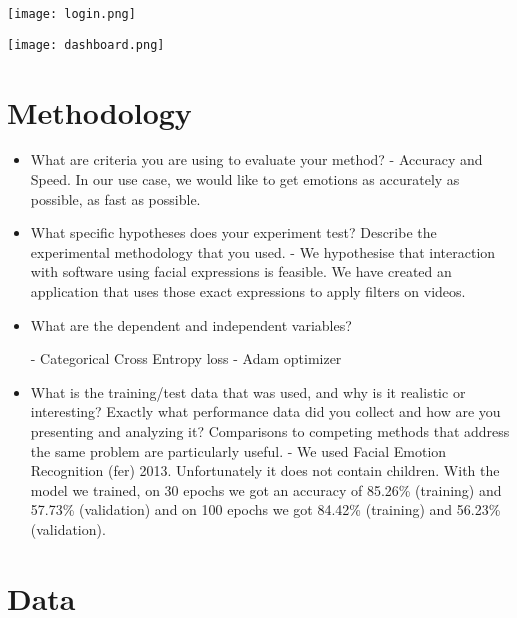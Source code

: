 \documentclass[runningheads,a4paper,11pt]{report}
\begin{document}
\begin{center}
    \texttt{[image: login.png]}
\end{center}

\begin{center}
    \texttt{[image: dashboard.png]}
\end{center}

\vspace{10mm}

\section{Methodology}
\label{section:methodology}

\begin{itemize}
	\item What are criteria you are using to evaluate your method? 
	\subitem - Accuracy and Speed. In our use case, we would like to get emotions as accurately as possible, as fast as possible.
	
	\item What specific hypotheses does your experiment test? Describe the experimental methodology that you used. 
    \subitem - We hypothesise that interaction with software using facial expressions is feasible. We have created an application that uses those exact expressions to apply filters on videos.
    
	\item What are the dependent and independent variables? 
	
	\subitem - Categorical Cross Entropy loss
	\subitem - Adam optimizer
	
	\item What is the training/test data that was used, and why is it realistic or interesting? Exactly what performance data did you collect and how are you presenting and analyzing it? Comparisons to competing methods that address the same problem are particularly useful.
	\subitem -  We used Facial Emotion Recognition (\gls{fer}) 2013. Unfortunately it does not contain children. With the model we trained, on 30 epochs we got an accuracy of 85.26\% (training) and 57.73\% (validation) and on 100 epochs we got 84.42\% (training) and 56.23\% (validation). 
\end{itemize}

\section{Data}
\label{section:data}
\end{document}
